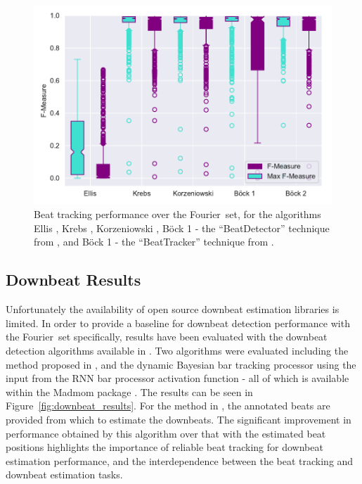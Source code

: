 \documentclass{article}
\newcommand{\setName}{Fourier}
\begin{document}
\begin{figure}
    \centerline{\includegraphics[width=\columnwidth]{figs/2019_04_09_19_15_00_Beat_TrackiMax_F-Measure.pdf}}
    \caption{Beat tracking performance over the \setName~set, for the algorithms Ellis \cite{Ellis2007}, Krebs \cite{Krebs2015}, Korzeniowski \cite{Korzeniowski2014}, B{\"o}ck 1 - the ``BeatDetector'' technique from \cite{Bock2011}, and B{\"o}ck 1 - the ``BeatTracker'' technique from \cite{Bock2011}.}
    \label{fig:beat_results}
\end{figure}

\subsection{Downbeat Results}

Unfortunately the availability of open source downbeat estimation libraries is limited. In order to provide a baseline for downbeat detection performance
with the \setName~set specifically, results have been evaluated with the downbeat detection algorithms available in \cite{Bock2016b}. Two algorithms were
evaluated including the method proposed in \cite{Bock2016a}, and the dynamic Bayesian bar tracking processor using the input from the RNN bar processor activation
function - all of which is available within the Madmom package \cite{Bock2016b}. The results can be seen in Figure~\ref{fig:downbeat_results}. For the method in \cite{Bock2016a}, the annotated beats are provided from which
to estimate the downbeats. The significant improvement in performance obtained by this algorithm over that with the estimated beat positions highlights the importance
of reliable beat tracking for downbeat estimation performance, and the interdependence between the beat tracking and downbeat estimation tasks.
\end{document}
